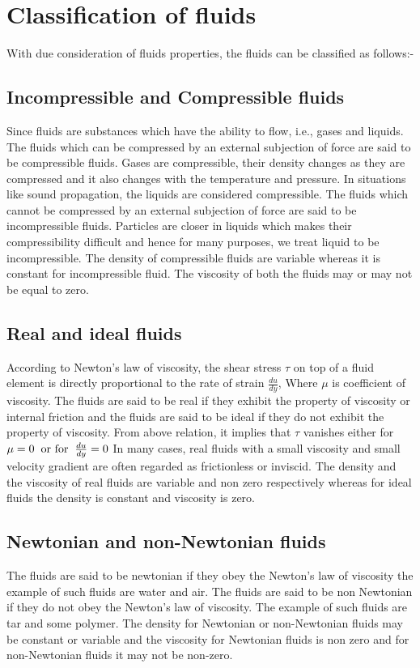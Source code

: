 \documentclass[14pt,one side, a4paper]{extbook}
\begin{document}
	 \section{Classification of fluids}
	 With due consideration of fluids properties, the fluids can be classified as follows\cite{raisinghania}:-
	 \subsection{Incompressible and Compressible fluids}
	 Since fluids are substances which have the ability to flow, i.e., gases and liquids. The fluids which can be compressed by an external subjection of force are said to be compressible fluids. Gases are compressible, their density changes as they are compressed and it also changes with the temperature and pressure. In situations like sound propagation, the liquids are considered compressible. The fluids which cannot be compressed by an external subjection of force are said to be incompressible fluids. Particles are closer in liquids which makes their compressibility difficult and hence for many purposes, we treat liquid to be incompressible. The density of compressible fluids are variable whereas it is constant for incompressible fluid. The viscosity of both the fluids may or may not be equal to zero. 
	 \subsection{Real and ideal fluids} According to Newton's law of viscosity, the shear stress $\tau$ on top of a fluid element is directly proportional to the rate of strain $\frac{du}{dy}$, Where $\mu$ is coefficient of viscosity. The fluids are said to be real if they exhibit the property of viscosity or internal friction and the fluids are said to be ideal if they do not exhibit the property of viscosity. From above relation, it implies that $\tau$ vanishes either for $\mu=0 \hspace*{0.2cm}\textrm{or for}\hspace*{0.2cm} \frac{du}{dy}=0$
	 In many cases, real fluids with a small viscosity and small velocity gradient are often regarded as frictionless or inviscid. The density and the viscosity of real fluids are variable and non zero respectively whereas for ideal fluids the density is constant and viscosity is zero. 
	
	 
	 \subsection{Newtonian and non-Newtonian fluids} The fluids are said to be newtonian if they obey the Newton's law of viscosity the example of such fluids are water and air. The fluids are said to be non Newtonian if they do not obey the Newton's law of viscosity. The example of such fluids are tar and some polymer. The density for Newtonian or non-Newtonian fluids may be constant or variable and the viscosity for Newtonian fluids is non zero and for non-Newtonian fluids it may not be non-zero.
\end{document}
